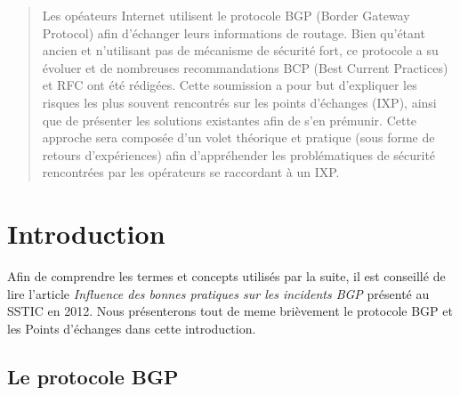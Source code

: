 



\maketitle
{}

\begin{abstract}
 Les opéateurs Internet utilisent le protocole BGP (Border Gateway Protocol) afin d'échanger leurs informations de routage. Bien qu'étant ancien et n'utilisant pas de mécanisme de sécurité fort, ce protocole a su évoluer et de nombreuses recommandations BCP (Best Current Practices) et RFC ont été rédigées.
 Cette soumission a pour but d'expliquer les risques les plus souvent rencontrés sur les points d'échanges (IXP), ainsi que de présenter les solutions existantes afin de s'en prémunir. Cette approche sera composée d'un volet théorique et pratique (sous forme de retours d'expériences) afin d'appréhender les problématiques de sécurité rencontrées par les opérateurs se raccordant à un IXP.
\end{abstract}


\section{Introduction}

Afin de comprendre les termes et concepts utilisés par la suite, il est conseillé de lire l'article \emph{Influence des bonnes pratiques sur les incidents BGP} \cite{fenioux:SSTIC2012} présenté au SSTIC en 2012. Nous présenterons tout de meme brièvement le protocole BGP et les Points d'échanges dans cette introduction.

\subsection{Le protocole BGP}

